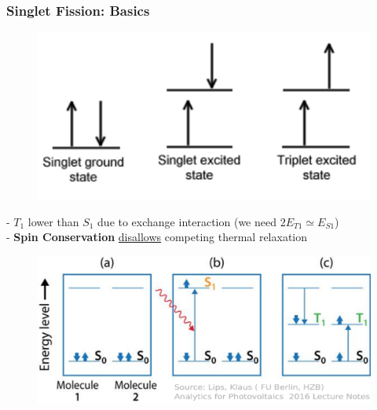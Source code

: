 \documentclass[compress]{beamer}
\begin{document}
\begin{frame}
  \frametitle{Singlet Fission: Basics}

\begin{multicols}{2}

\begin{figure}[H]
\includegraphics[width=1\columnwidth]{../img/SF_esq7.pdf}
\end{figure}

- $T_1$ lower than $S_1$ due to exchange interaction (we need $2E_{T1}\simeq E_{S1}$)\\
- \textbf{Spin Conservation} \underline{disallows} competing thermal relaxation\\
\end{multicols}

\begin{figure}[H]
\includegraphics[width=1\columnwidth]{../img/SF_esq9.pdf}
\end{figure}


\end{frame}
\end{document}
